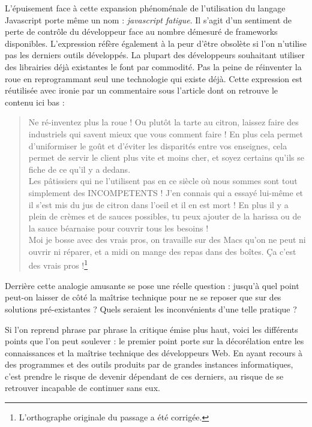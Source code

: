 \documentclass[a4paper,12pt,twoside]{book}
\begin{document}
L'épuisement face à cette expansion phénoménale de l'utilisation du langage Javascript porte même un nom : \textit{javascript fatigue}. Il s'agit d'un sentiment de perte de contrôle du développeur face au nombre démesuré de frameworks disponibles. L'expression réfère également à la peur d'être obsolète si l'on n'utilise pas les derniers outils développés.
La plupart des développeurs souhaitant utiliser des librairies déjà existantes le font par commodité. Pas la peine de \og réinventer la roue \fg{} en reprogrammant seul une technologie qui existe déjà. Cette expression est réutilisée avec ironie par un commentaire sous l'article dont on retrouve le contenu ici bas :

\begin{quote}
    Ne ré-inventez plus la roue ! Ou plutôt la tarte au citron, laissez faire des
industriels qui savent mieux que vous comment faire ! En plus cela permet
d'uniformiser le goût et d'éviter les disparités entre vos enseignes, cela
permet de servir le client plus vite et moins cher, et soyez certains qu'ils se
fiche de ce qu'il y a dedans.\\
Les pâtissiers qui ne l'utilisent pas en ce siècle où nous sommes sont tout simplement des INCOMPETENTS ! J'en connais
qui a essayé lui-même et il s'est mis du jus de citron dans l'oeil et il en est
mort ! En plus il y a plein de crèmes et de sauces possibles, tu peux ajouter
de la harissa ou de la sauce béarnaise pour couvrir tous les besoins !\\ Moi je
bosse avec des vrais pros, on travaille sur des Macs qu'on ne peut ni ouvrir
ni réparer, et a midi on mange des repas dans des boîtes. Ça c'est des vrais
pros !\footnote{L'orthographe originale du passage a été corrigée.}
\end{quote}

Derrière cette analogie amusante se pose une réelle question : jusqu'à quel point peut-on laisser de côté la maîtrise technique pour ne se reposer que sur des solutions pré-existantes ? Quels seraient les inconvénients d'une telle pratique ?

Si l'on reprend phrase par phrase la critique émise plus haut, voici les différents points que l'on peut soulever : le premier point porte sur la décorélation entre les connaissances et la maîtrise technique des développeurs Web. En ayant recours à des programmes et des outils produits par de grandes instances informatiques, c'est prendre le risque de devenir dépendant de ces derniers, au risque de se retrouver incapable de continuer sans eux.
\end{document}
